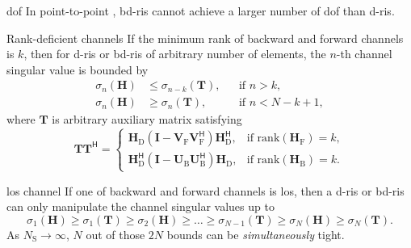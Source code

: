 \documentclass[final,xcolor={table}]{beamer}
\newlength{\colwidth}
\begin{document}
\begin{frame}[t]
\begin{columns}[t]
		\begin{column}{\colwidth}
			\vspace{-1cm}
			\begin{prop}{\gls{dof}}{}
				\setlength{\leftskip}{\leftmargini}
				\setlength{\rightskip}{\leftmargini}
				In point-to-point , \gls{bd}-\gls{ris} cannot achieve a larger number of \gls{dof} than \gls{d}-\gls{ris}.
			\end{prop}

			\begin{prop}{Rank-deficient channels}{}
				\setlength{\leftskip}{\leftmargini}
				\setlength{\rightskip}{\leftmargini}
				If the minimum rank of backward and forward channels is $k$,
				then for \gls{d}-\gls{ris} or \gls{bd}-\gls{ris} of arbitrary number of elements, the $n$-th channel singular value is bounded by
				\begin{align*}
					\sigma_n(\mathbf{H}) & \le \sigma_{n-k}(\mathbf{T}), &  & \text{if } n > k, \\
					\sigma_n(\mathbf{H}) & \ge \sigma_n(\mathbf{T}),     &  & \text{if } n < N - k + 1,
				\end{align*}
				where $\mathbf{T}$ is arbitrary auxiliary matrix satisfying
				\begin{equation*}
					\mathbf{T} \mathbf{T}^\mathsf{H} =
					\begin{cases}
						\mathbf{H}_\mathrm{D} (\mathbf{I} - \mathbf{V}_\mathrm{F} \mathbf{V}_\mathrm{F}^\mathsf{H}) \mathbf{H}_\mathrm{D}^\mathsf{H}, & \text{if } \mathrm{rank}(\mathbf{H}_\mathrm{F}) = k, \\
						\mathbf{H}_\mathrm{D}^\mathsf{H} (\mathbf{I} - \mathbf{U}_\mathrm{B} \mathbf{U}_\mathrm{B}^\mathsf{H}) \mathbf{H}_\mathrm{D}, & \text{if } \mathrm{rank}(\mathbf{H}_\mathrm{B}) = k.
					\end{cases}
				\end{equation*}
				\vspace{-0.5cm}
			\end{prop}

			\begin{coro}{\gls{los} channel}{}
				\setlength{\leftskip}{\leftmargini}
				\setlength{\rightskip}{\leftmargini}
				If one of backward and forward channels is \gls{los}, then a \gls{d}-\gls{ris} or \gls{bd}-\gls{ris} can only manipulate the channel singular values up to
				\begin{equation*}
					\sigma_1(\mathbf{H}) \ge \sigma_1(\mathbf{T}) \ge {\sigma_2(\mathbf{H})} \ge \ldots \ge \sigma_{N-1}(\mathbf{T}) \ge {\sigma_N(\mathbf{H})} \ge \sigma_N(\mathbf{T}).
				\end{equation*}
				As $N_\mathrm{S} \to \infty$, $N$ out of those $2N$ bounds can be \emph{simultaneously} tight.
			\end{coro}


\end{column}
\end{columns}
\end{frame}
\end{document}
